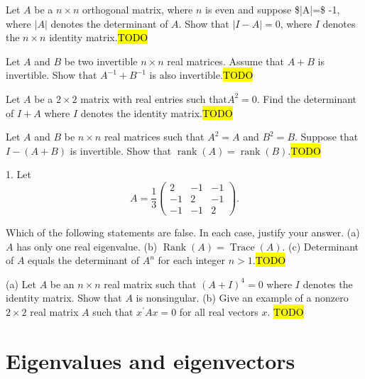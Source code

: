 \begin{example}
\label{exa:isi2005samplepsb3}Let $A$ be a $n\times n$ orthogonal
matrix, where $n$ is even and suppose \$|A|=\$ -1, where $|A|$ denotes
the determinant of $A$. Show that $|I-A|=0$, where $I$ denotes
the $n\times n$ identity matrix.\hl{TODO}
\end{example}

\begin{example}
\label{exa:isi2006samplepsb1}Let $A$ and $B$ be two invertible
$n\times n$ real matrices. Assume that $A+B$ is invertible. Show
that $A^{-1}+B^{-1}$ is also invertible.\hl{TODO}
\end{example}

\begin{example}
\label{exa:isi2007samplepsb1}Let $A$ be a $2\times2$ matrix with
real entries such that$A^{2}=0$. Find the determinant of $I+A$ where
$I$ denotes the identity matrix.\hl{TODO}
\end{example}

\begin{example}
\label{exa:isi2007samplepsb2}Let $A$ and $B$ be $n\times n$ real
matrices such that $A^{2}=A$ and $B^{2}=B$. Suppose that $I-(A+B)$
is invertible. Show that $\operatorname{rank}(A)=\operatorname{rank}(B)$.\hl{TODO}
\end{example}

\begin{example}
\label{exa:isi2008samplepsb1}1. Let 
\[
A=\frac{1}{3}\left(\begin{array}{rrr}
2 & -1 & -1\\
-1 & 2 & -1\\
-1 & -1 & 2
\end{array}\right).
\]

Which of the following statements are false. In each case, justify
your answer. (a) $A$ has only one real eigenvalue. (b) $\operatorname{Rank}(A)=\operatorname{Trace}(A)$.
(c) Determinant of $A$ equals the determinant of $A^{n}$ for each
integer $n>1$.\hl{TODO}
\end{example}

\begin{example}
	\label{exa:isi2009samplepsb1}
	 (a) Let $A$ be an $n \times n$ real matrix such that $(A+I)^4=0$ where $I$ denotes the identity matrix. Show that $A$ is nonsingular.
	(b) Give an example of a nonzero $2 \times 2$ real matrix $A$ such that $x^{\prime} A x=0$ for all real vectors $x$. \hl{TODO}
\end{example}


\section{Eigenvalues and eigenvectors\label{sec:finiteDimEigenvalues}}
